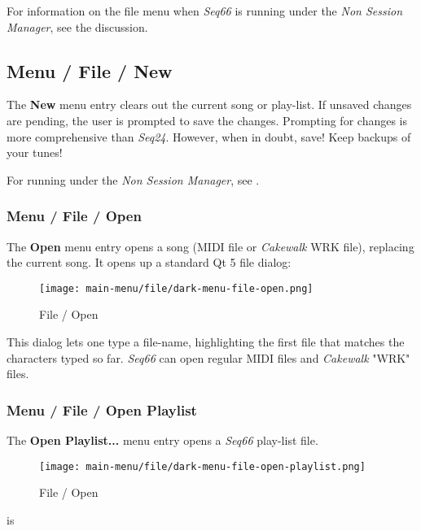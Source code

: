    For information on the file menu when \textsl{Seq66} is
   running under the \textsl{Non Session Manager}, see
   the  discussion.


\subsection{Menu / File / New}
\label{subsec:menu_file_new}

   The \textbf{New} menu entry clears out the current song or play-list.
   If unsaved changes are pending, the user is prompted to save the changes.
   Prompting for changes is more comprehensive than \textsl{Seq24}.
   However, when in doubt, save!  Keep backups of your tunes!

   For running under the \textsl{Non Session Manager}, see
   .

\subsubsection{Menu / File / Open}
\label{subsubsec:seq66_menu_file_open}

   The \textbf{Open} menu entry opens a song (MIDI file or \textsl{Cakewalk}
   WRK file), replacing the current song.
   It opens up a standard Qt 5 file dialog:

\begin{figure}[H]
   \centering 
   \texttt{[image: main-menu/file/dark-menu-file-open.png]}
   \caption{File / Open}
   \label{fig:seq66_menu_file_open}
\end{figure}

   This dialog lets one type a file-name, highlighting the first file
   that matches the characters typed so far.
   \textsl{Seq66} can open regular MIDI files and
   \textsl{Cakewalk} "WRK" files.

\subsubsection{Menu / File / Open Playlist}
\label{subsubsec:seq66_menu_file_open}

   The \textbf{Open Playlist...} menu entry opens a \textsl{Seq66}
   play-list file.

\begin{figure}[H]
   \centering 
   \texttt{[image: main-menu/file/dark-menu-file-open-playlist.png]}
   \caption{File / Open}
   \label{fig:seq66_menu_file_open_playlist}
\end{figure}is

